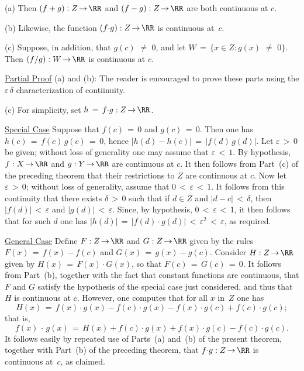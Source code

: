 \V

        (a) Then $(f+g):Z \,{\rightarrow}\, {\RR}$ and $(f-g):Z \,{\rightarrow}\, {\RR}$ are both continuous at $c$.

\V

        (b) Likewise, the function $(f{\cdot}g):Z \,{\rightarrow}\, {\RR}$ is continuous at~$c$.

\V

        (c) Suppose, in addition, that $g(c) \,\,{\neq}\,\, 0$, and let $W \,=\, \{x{\in}Z: g(x) \,\,{\neq}\,\, 0\}$.
    Then $(f/g):W \,{\rightarrow}\, {\RR}$ is continuous at $c$.

\V

        \underline{Partial Proof} (a) and (b): The reader is encouraged to prove these parts using the ${\varepsilon}\,{\delta}$ characterization of contiinuity.

\V

        (c) For simplicity, set $h \,=\, f{\cdot}g:Z \,{\rightarrow}\, {\RR}$.

        \underline{Special Case} Suppose that $f(c) \,=\, 0$ and $g(c) \,=\, 0$. Then one has $h(c) \,=\, f(c)\,g(c) \,=\, 0$,
    hence $|h(d) - h(c)| \,=\, |f(d)\,g(d)|$. Let ${\varepsilon}\,>\,0$ be given; without loss of generality one may assume that ${\varepsilon}\,<\,1$.
    By hypothesis, $f:X \,{\rightarrow}\, {\RR}$ and $g:Y \,{\rightarrow}\, {\RR}$ are continuous at $c$.
    It then follows from Part~(c) of the preceding theorem that their restrictions to $Z$ are continuous at $c$.
    Now let ${\varepsilon}\,>\,0$; without loss of generality, assume that $0\,<\,{\varepsilon}\,<\,1$.
    It follows from this continuity that there exists ${\delta}\,>\,0$ such that if $d{\in}Z$ and $|d-c|\,<\,{\delta}$,
    then $|f(d)|\,<\,{\varepsilon}$ and $|g(d)|\,<\,{\varepsilon}$. Since, by hypothesis, $0\,<\,{\varepsilon}\,<\,1$,
    it then follows that for such $d$ one has $|h(d)| \,=\, |f(d){\cdot}g(d)|\,<\,{\varepsilon}^{2}\,<\,{\varepsilon}$, as required.

        \underline{General Case} Define $F:Z \,{\rightarrow}\, {\RR}$ and $G:Z \,{\rightarrow}\, {\RR}$
    given by the rules $F(x) \,=\, f(x)-f(c)$ and $G(x) \,=\, g(x)-g(c)$.
Consider  $H:Z \,{\rightarrow}\, {\RR}$
    given by $H(x) \,=\, F(x){\cdot}G(x)$, so that $F(c) \,=\, G(c) \,=\, 0$.
    It follows from Part~(b), together with the fact that constant functions are continuous,
    that $F$ and $G$ satisfy the hypothesis of the special case just considered, and thus that $H$ is continuous at $c$.
    However, one computes that for all $x$ in~$Z$ one has
        \begin{displaymath}
        H(x) \,=\,
        f(x){\cdot}g(x) - f(c){\cdot}g(x) - f(x){\cdot}g(c) + f(c){\cdot}g(c);
        \end{displaymath}
    that is,
        \begin{displaymath}
        f(x)\,{\cdot}\,g(x) \,=\,
    H(x) + f(c){\cdot}g(x) + f(x){\cdot}g(c) - f(c){\cdot}g(c).
        \end{displaymath}
    It follows easily by repeated use of Parts~(a) and~(b) of the present theorem, together with Part~(b) of the preceding theorem,
    that $f{\cdot}g:Z \,{\rightarrow}\, {\RR}$ is continuous at~$c$, as claimed.
\VV


